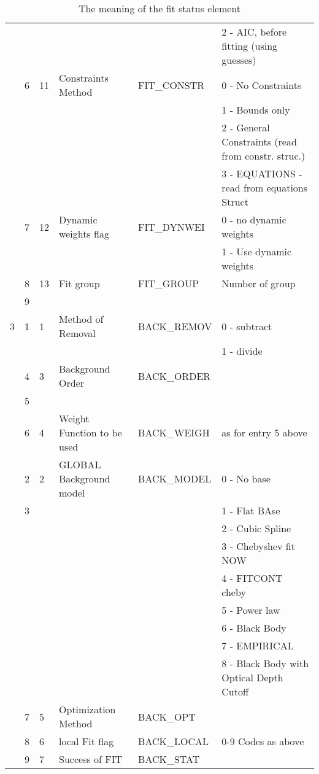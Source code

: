 \begin{latexonly}
\begin{table}
\begin{center}
\begin{tabular}{|l|l|l|l|l|l|}
  &   &   &  & &         2 - AIC, before fitting (using guesses)\\ \cline{2-6}
  & 6 & 11 & Constraints Method & FIT\_CONSTR & 0 - No Constraints\\
  &   &   &  & & 1 - Bounds only\\
  &   &   &  & & 2 - General Constraints (read from constr. struc.)\\
  &   &   &  & & 3 - EQUATIONS  -read from equations Struct\\ \cline{2-6}
  & 7 & 12 & Dynamic weights flag & FIT\_DYNWEI & 0 - no dynamic weights\\
  &   &   &  & & 1 - Use dynamic weights\\ \cline{2-6}
  & 8 & 13 & Fit group & FIT\_GROUP & Number of group \\
  & 9 &    & & & \\
\hline
3  & 1 & 1 &Method of Removal & BACK\_REMOV & 0 - subtract \\
  &   &   &                  & & 1 - divide\\
\cline{2-6}
  & 4 & 3 & Background Order & BACK\_ORDER & \\
  & 5 & & & & \\
\cline{2-6}
  & 6 & 4 & Weight Function to be used & BACK\_WEIGH & as for entry 5 above \\
\cline{2-6}
  & 2 & 2 &GLOBAL Background model & BACK\_MODEL & 0 - No base\\
  & 3 &   &                        & & 1 - Flat BAse\\
  &   &   &                        & & 2 - Cubic Spline\\
  &   &   &                        & & 3 - Chebyshev fit NOW\\
  &   &   &                        & & 4 - FITCONT cheby\\
  &   &   &                        & & 5 - Power law\\
  &   &   &                        & & 6 - Black Body\\
  &   &   &                        & & 7 - EMPIRICAL\\
  &   &   &    & & 8 - Black Body with Optical Depth Cutoff\\
\cline{2-6}
 & 7 & 5 & Optimization Method & BACK\_OPT & \\ \cline{2-6}
 & 8 & 6 & local Fit flag & BACK\_LOCAL & 0-9 Codes as above \\ \cline{2-6}
 & 9 & 7 &      Success of FIT & BACK\_STAT & \\
\hline
\end{tabular}
\caption[a]{The meaning of the fit status element}
\label{tb.fitstatus}
\end{center}
\end{table}
\end{latexonly}

